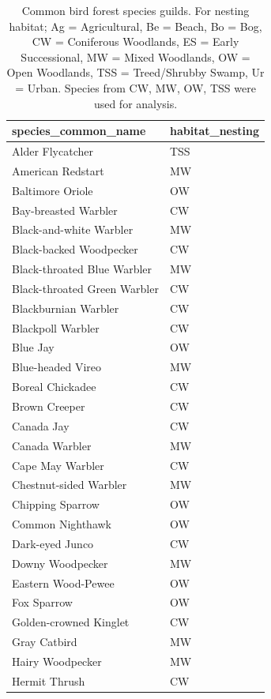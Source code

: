 \documentclass[
  letterpaper,
  DIV=11,
  numbers=noendperiod,
  oneside]{scrartcl}
\begin{document}
\hypertarget{tbl-bird-guilds}{}
\begin{table}
\caption{\label{tbl-bird-guilds}Common bird forest species guilds. For nesting habitat; Ag =
Agricultural, Be = Beach, Bo = Bog, CW = Coniferous Woodlands, ES =
Early Successional, MW = Mixed Woodlands, OW = Open Woodlands, TSS =
Treed/Shrubby Swamp, Ur = Urban. Species from CW, MW, OW, TSS were used
for analysis. }\tabularnewline

\centering
\begin{tabular}{l|l}
\hline
species\_common\_name & habitat\_nesting\\
\hline
Alder Flycatcher & TSS\\
\hline
American Redstart & MW\\
\hline
Baltimore Oriole & OW\\
\hline
Bay-breasted Warbler & CW\\
\hline
Black-and-white Warbler & MW\\
\hline
Black-backed Woodpecker & CW\\
\hline
Black-throated Blue Warbler & MW\\
\hline
Black-throated Green Warbler & CW\\
\hline
Blackburnian Warbler & CW\\
\hline
Blackpoll Warbler & CW\\
\hline
Blue Jay & OW\\
\hline
Blue-headed Vireo & MW\\
\hline
Boreal Chickadee & CW\\
\hline
Brown Creeper & CW\\
\hline
Canada Jay & CW\\
\hline
Canada Warbler & MW\\
\hline
Cape May Warbler & CW\\
\hline
Chestnut-sided Warbler & MW\\
\hline
Chipping Sparrow & OW\\
\hline
Common Nighthawk & OW\\
\hline
Dark-eyed Junco & CW\\
\hline
Downy Woodpecker & MW\\
\hline
Eastern Wood-Pewee & OW\\
\hline
Fox Sparrow & OW\\
\hline
Golden-crowned Kinglet & CW\\
\hline
Gray Catbird & MW\\
\hline
Hairy Woodpecker & MW\\
\hline
Hermit Thrush & CW\\

\end{tabular}
\end{table}
\end{document}
